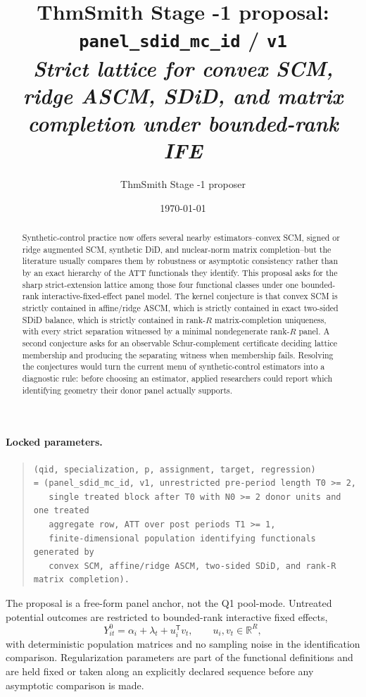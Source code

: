 \documentclass[11pt]{article}
\title{ThmSmith Stage -1 proposal: \texttt{panel\_sdid\_mc\_id} / \texttt{v1}%
  \\ \large\textit{Strict lattice for convex SCM, ridge ASCM, SDiD, and matrix completion under bounded-rank IFE}}
\author{ThmSmith Stage -1 proposer}
\date{\today}
\newcommand{\transpose}{\mathsf{T}}
\newcommand{\R}{\mathbb{R}}
\theoremstyle{definition}
\theoremstyle{plain}
\theoremstyle{remark}
\begin{document}
\maketitle


\paragraph{Locked parameters.}
\begin{quote}
\begin{verbatim}
(qid, specialization, p, assignment, target, regression)
= (panel_sdid_mc_id, v1, unrestricted pre-period length T0 >= 2,
   single treated block after T0 with N0 >= 2 donor units and one treated
   aggregate row, ATT over post periods T1 >= 1,
   finite-dimensional population identifying functionals generated by
   convex SCM, affine/ridge ASCM, two-sided SDiD, and rank-R matrix completion).
\end{verbatim}
\end{quote}
The proposal is a free-form panel anchor, not the Q1 pool-mode.  Untreated potential outcomes are restricted to bounded-rank interactive fixed effects,
\[
Y^0_{it}=\alpha_i+\lambda_t+u_i^\transpose v_t,\qquad u_i,v_t\in\R^R,
\]
with deterministic population matrices and no sampling noise in the identification comparison.  Regularization parameters are part of the functional definitions and are held fixed or taken along an explicitly declared sequence before any asymptotic comparison is made.

\begin{abstract}
Synthetic-control practice now offers several nearby estimators--convex SCM, signed or ridge augmented SCM, synthetic DiD, and nuclear-norm matrix completion--but the literature usually compares them by robustness or asymptotic consistency rather than by an exact hierarchy of the ATT functionals they identify. This proposal asks for the sharp strict-extension lattice among those four functional classes under one bounded-rank interactive-fixed-effect panel model. The kernel conjecture is that convex SCM is strictly contained in affine/ridge ASCM, which is strictly contained in exact two-sided SDiD balance, which is strictly contained in rank-\(R\) matrix-completion uniqueness, with every strict separation witnessed by a minimal nondegenerate rank-\(R\) panel. A second conjecture asks for an observable Schur-complement certificate deciding lattice membership and producing the separating witness when membership fails. Resolving the conjectures would turn the current menu of synthetic-control estimators into a diagnostic rule: before choosing an estimator, applied researchers could report which identifying geometry their donor panel actually supports.
\end{abstract}
\end{document}
